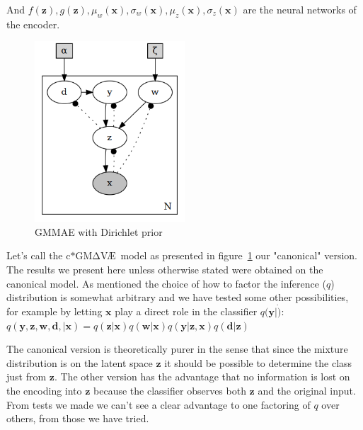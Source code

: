 \documentclass[11pt, a4paper]{report}
\theoremstyle{plain}
\theoremstyle{definition}
\theoremstyle{remark}
\newcommand{\x}{\mathbf{x}}
\newcommand{\z}{\mathbf{z}}
\newcommand{\y}{\mathbf{y}}
\newcommand{\w}{\mathbf{w}}
\newcommand{\dd}{\mathbf{d}}
\newcommand{\gmvae}{c$\ast$GM$\mathrm{\Delta}$V\AE~}
\begin{document}
And $f(\z),g(\z), \mu_w(\x), \sigma_w(\x), \mu_z(\x), \sigma_z(\x)$ are
the neural networks of the encoder.


\begin{figure}[H]
\centering
\includegraphics[width=0.5\textwidth]{plots/dirichlet_gmm.gv.png}
\caption{GMMAE with Dirichlet prior}
\label{fig:dirgmm}
\end{figure}

Let's call the \gmvae model as presented in figure~\ref{fig:dirgmm} our
"canonical" version. The results we present here unless otherwise stated were
obtained on the canonical model. As mentioned the choice of how to factor the
inference ($q$) distribution is somewhat arbitrary and we have tested some other
possibilities, for example by letting $\x$ play a direct role in the
classifier $q(\y | \dot)$:
$q(\y, \z, \w, \dd, | \x) = 
q(\z | \x)q(\w | \x)q(\y | \z, \x)q(\dd | \z)$ 

The canonical version is theoretically purer in the sense that since the
mixture distribution is on the latent space $\z$ it should be possible to
determine the class just from $\z$. The other version has the advantage that no
information is lost on the encoding into $\z$ because the classifier observes
both $\z$ and the original input. From tests we made we can't see a clear
advantage to one factoring of $q$ over others, from those we have tried.
\end{document}
